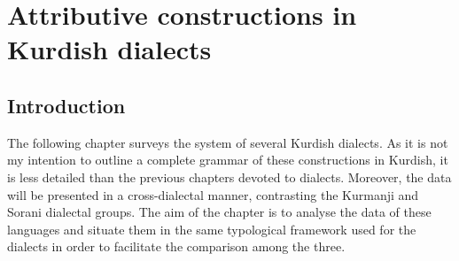 






\chapter{Attributive constructions in Kurdish dialects} \label{ch:Kurdish}

\renewcommand{\defaultDialect}{}

\section{Introduction}

The following chapter surveys the  system of several Kurdish dialects. As it is not my intention to outline a complete grammar of these constructions in Kurdish, it is less detailed than the previous chapters devoted to  dialects. Moreover, the data will be presented in a cross-dialectal manner, contrasting the Kurmanji and Sorani dialectal groups. The aim of the chapter is to analyse the data of these languages and situate them in the same typological framework used for the  dialects in order to facilitate the comparison among the three.

